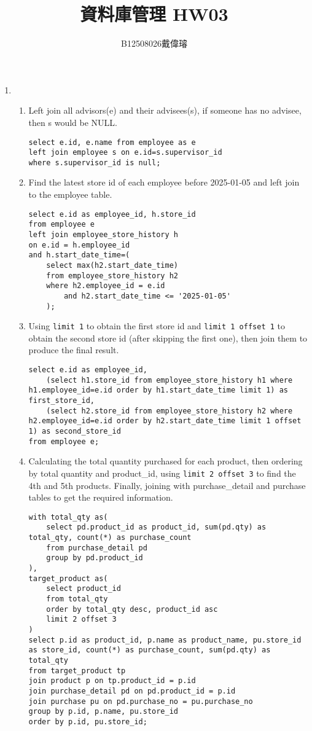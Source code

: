 \documentclass[12pt,a4paper]{article}
\title{資料庫管理 HW03}
\author{B12508026戴偉璿}
\date{}
\begin{document}
\maketitle


\begin{enumerate}
    \item 
    \begin{enumerate}
        \item Left join all advisors(e) and their advisees(s), if someone has no advisee, then s would be NULL.
        \begin{verbatim}
select e.id, e.name from employee as e
left join employee s on e.id=s.supervisor_id
where s.supervisor_id is null;
        \end{verbatim}
        \item Find the latest store id of each employee before 2025-01-05 and left join to the employee table.
        \begin{verbatim}
select e.id as employee_id, h.store_id
from employee e
left join employee_store_history h
on e.id = h.employee_id
and h.start_date_time=(
    select max(h2.start_date_time)
    from employee_store_history h2
    where h2.employee_id = e.id
        and h2.start_date_time <= '2025-01-05'
    );           
        \end{verbatim}
        \item Using \texttt{limit 1} to obtain the first store id and \texttt{limit 1 offset 1} to obtain the second store id (after skipping the first one), then join them to produce the final result.
        \begin{verbatim}
select e.id as employee_id,
    (select h1.store_id from employee_store_history h1 where h1.employee_id=e.id order by h1.start_date_time limit 1) as first_store_id,
    (select h2.store_id from employee_store_history h2 where h2.employee_id=e.id order by h2.start_date_time limit 1 offset 1) as second_store_id
from employee e;
        \end{verbatim}
        \item Calculating the total quantity purchased for each product, then ordering by total quantity and product\_id, using \texttt{limit 2 offset 3} to find the 4th and 5th products. Finally, joining with purchase\_detail and purchase tables to get the required information.
        \begin{verbatim}
with total_qty as(
    select pd.product_id as product_id, sum(pd.qty) as total_qty, count(*) as purchase_count
    from purchase_detail pd
    group by pd.product_id
),
target_product as(
    select product_id
    from total_qty
    order by total_qty desc, product_id asc
    limit 2 offset 3
)
select p.id as product_id, p.name as product_name, pu.store_id as store_id, count(*) as purchase_count, sum(pd.qty) as total_qty
from target_product tp
join product p on tp.product_id = p.id
join purchase_detail pd on pd.product_id = p.id
join purchase pu on pd.purchase_no = pu.purchase_no
group by p.id, p.name, pu.store_id
order by p.id, pu.store_id;
        \end{verbatim}
    \end{enumerate}
\end{enumerate}
\end{document}
